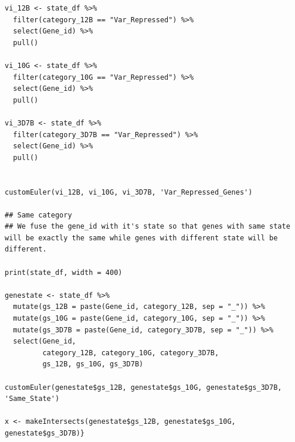 \documentclass[11pt]{article}
\begin{document}
\begin{verbatim}
vi_12B <- state_df %>%
  filter(category_12B == "Var_Repressed") %>%
  select(Gene_id) %>%
  pull()

vi_10G <- state_df %>%
  filter(category_10G == "Var_Repressed") %>%
  select(Gene_id) %>%
  pull()

vi_3D7B <- state_df %>%
  filter(category_3D7B == "Var_Repressed") %>%
  select(Gene_id) %>%
  pull()


customEuler(vi_12B, vi_10G, vi_3D7B, 'Var_Repressed_Genes')

## Same category
## We fuse the gene_id with it's state so that genes with same state will be exactly the same while genes with different state will be different.

print(state_df, width = 400)

genestate <- state_df %>%
  mutate(gs_12B = paste(Gene_id, category_12B, sep = "_")) %>%
  mutate(gs_10G = paste(Gene_id, category_10G, sep = "_")) %>%
  mutate(gs_3D7B = paste(Gene_id, category_3D7B, sep = "_")) %>%
  select(Gene_id,
         category_12B, category_10G, category_3D7B,
         gs_12B, gs_10G, gs_3D7B)

customEuler(genestate$gs_12B, genestate$gs_10G, genestate$gs_3D7B, 'Same_State')

x <- makeIntersects(genestate$gs_12B, genestate$gs_10G, genestate$gs_3D7B)}
\end{verbatim}
\end{document}
